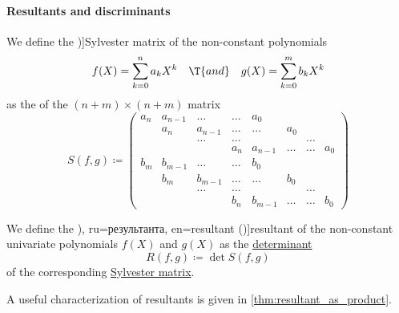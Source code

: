 \paragraph{Resultants and discriminants}

\begin{definition}\label{def:sylvester_matrix}
  We define the \term[ru=матрица Сильвестра, en=Sylvester's matrix (\cite[exerc. 4.6.1.12]{Knuth1997ArtVol2})]{Sylvester matrix} of the non-constant polynomials
  \begin{align*}
    f(X) = \sum_{k=0}^n a_k X^k
    &&\T{and}&&
    g(X) = \sum_{k=0}^m b_k X^k
  \end{align*}
  as the  of the \( (n + m) \times (n + m) \) matrix
  \begin{equation*}
    S(f, g) \coloneqq
    \begin{pmatrix}
      a_n    & a_{n-1} & \ldots  & \ldots  & a_0     &        &        &        \\
             & a_n     & a_{n-1} & \ldots  & \ldots  & a_0    &        &        \\
             &         & \ldots  & \ldots  &         &        & \ldots &        \\
             &         &         & a_n     & a_{n-1} & \ldots & \ldots & a_0    \\
      b_m    & b_{m-1} & \ldots  & \ldots  & b_0     &        &        &        \\
             & b_m     & b_{m-1} & \ldots  & \ldots  & b_0    &        &        \\
             &         & \ldots  & \ldots  &         &        & \ldots &        \\
             &         &         & b_n     & b_{m-1} & \ldots & \ldots & b_0
    \end{pmatrix}
  \end{equation*}
\end{definition}

\begin{definition}\label{def:resultant}
  We define the \term[bg=резултанта (\cite[198]{Обрешков1962ВисшаАлгебра}), ru=результанта, en=resultant (\cite[674]{Knuth1997ArtVol2})]{resultant} of the non-constant univariate polynomials \( f(X) \) and \( g(X) \) as the \hyperref[def:matrix_determinant]{determinant}
  \begin{equation*}
    R(f, g) \coloneqq \det S(f, g)
  \end{equation*}
  of the corresponding \hyperref[def:sylvester_matrix]{Sylvester matrix}.
\end{definition}
\begin{comments}
  \item A useful characterization of resultants is given in \cref{thm:resultant_as_product}.
\end{comments}


